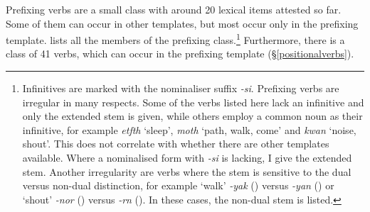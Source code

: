 Prefixing verbs are a small class with around 20 lexical items attested so far. Some of them can occur in other templates, but most occur only in the prefixing template.  lists all the members of the prefixing class.\footnote{Infinitives are marked with the nominaliser suffix \emph{-si}. Prefixing verbs are irregular in many respects. Some of the verbs listed here lack an infinitive and only the extended stem is given, while others employ a common noun as their infinitive, for example \emph{etfth} `sleep', \emph{moth} `path, walk, come' and \emph{kwan} `noise, shout'. This does not correlate with whether there are other templates available. Where a nominalised form with \emph{-si} is lacking, I give the extended stem. Another irregularity are verbs where the stem is sensitive to the dual versus non-dual distinction, for example `walk' \emph{-yak} (\Ndu) versus \emph{-yan} (\Du) or `shout' \emph{-nor} (\Ndu) versus \emph{-rn} (\Du). In these cases, the non-dual stem is listed.} Furthermore, there is a class of 41  verbs, which can occur in the prefixing template ({\S}\ref{positionalverbs}).

